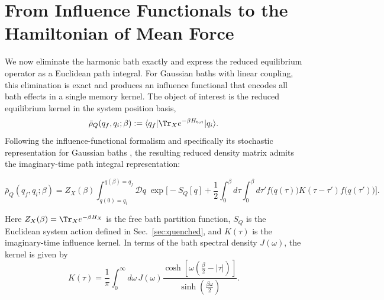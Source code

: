\section{\label{sec:influence_to_hmf}From Influence Functionals to the Hamiltonian of Mean Force}

We now eliminate the harmonic bath exactly and express the reduced equilibrium operator as a Euclidean path integral. For Gaussian baths with linear coupling, this elimination is exact and produces an influence functional that encodes all bath effects in a single memory kernel. The object of interest is the reduced equilibrium kernel in the system position basis,
\begin{equation}
    \bar\rho_Q(q_f,q_i;\beta) := \langle q_f|\Tr_X e^{-\beta H_{\mathrm{tot}}}|q_i\rangle.
    \label{eq:reduced_kernel_again}
\end{equation}
Following the influence-functional formalism \cite{feynmanTheoryGeneralQuantum1963a,caldeiraQuantumTunnellingDissipative1983a,grabertQuantumBrownianMotion1988} and specifically its stochastic representation for Gaussian baths \cite{mccaulPartitionfreeApproachOpen2017c, mccaulDrivingSpinbosonModels2018a, mccaulHowWinFriends2021b}, the resulting reduced density matrix admits the imaginary-time path integral representation:
\begin{widetext}
\begin{equation}
    \bar\rho_Q(q_f,q_i;\beta) = Z_X(\beta) \int_{q(0)=q_i}^{q(\beta)=q_f}\!\!\mathcal D q\; \exp\Bigg[ -S_Q[q] + \frac{1}{2}\int_0^\beta d\tau\int_0^\beta d\tau' f\big(q(\tau)\big) K(\tau-\tau') f\big(q(\tau')\big) \Bigg].
    \label{eq:reduced_effective_PI}
\end{equation}
\end{widetext}
Here $Z_X(\beta)=\Tr_X e^{-\beta H_X}$ is the free bath partition function, $S_Q$ is the Euclidean system action defined in Sec.~\ref{sec:quenched}, and $K(\tau)$ is the imaginary-time influence kernel. In terms of the bath spectral density $J(\omega)$, the kernel is given by
\begin{equation}
    K(\tau) = \frac{1}{\pi}\int_0^\infty d\omega\, J(\omega) \frac{\cosh\!\left[\omega\left(\frac{\beta}{2}-|\tau|\right)\right]} {\sinh\!\left(\frac{\beta\omega}{2}\right)}.
    \label{eq:kernel_spectral}
\end{equation}

